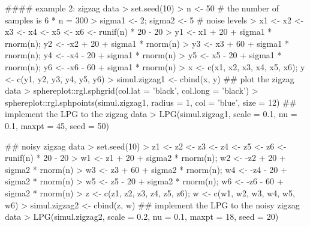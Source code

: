 \begin{example}
   #### example 2: zigzag data
   > set.seed(10)
   > n <- 50                                # the number of samples is 6 * n = 300
   > sigma1 <- 2; sigma2 <- 5               # noise levels                   
   > x1 <- x2 <- x3 <- x4 <- x5 <- x6 <- runif(n) * 20 - 20
   > y1 <- x1 + 20 + sigma1 * rnorm(n); y2 <- -x2 + 20 + sigma1 * rnorm(n)
   > y3 <- x3 + 60 + sigma1 * rnorm(n); y4 <- -x4 - 20 + sigma1 * rnorm(n)
   > y5 <- x5 - 20 + sigma1 * rnorm(n); y6 <- -x6 - 60 + sigma1 * rnorm(n)
   > x <- c(x1, x2, x3, x4, x5, x6); y <- c(y1, y2, y3, y4, y5, y6)
   > simul.zigzag1 <- cbind(x, y)
   ## plot the zigzag data
   > sphereplot::rgl.sphgrid(col.lat = 'black', col.long = 'black')
   > sphereplot::rgl.sphpoints(simul.zigzag1, radius = 1, col = 'blue', size = 12)
   ## implement the LPG to the zigzag data
   > LPG(simul.zigzag1, scale = 0.1, nu = 0.1, maxpt = 45, seed = 50)

   ## noisy zigzag data
   > set.seed(10)
   > z1 <- z2 <- z3 <- z4 <- z5 <- z6 <- runif(n) * 20 - 20
   > w1 <- z1 + 20 + sigma2 * rnorm(n); w2 <- -z2 + 20 + sigma2 * rnorm(n)
   > w3 <- z3 + 60 + sigma2 * rnorm(n); w4 <- -z4 - 20 + sigma2 * rnorm(n)
   > w5 <- z5 - 20 + sigma2 * rnorm(n); w6 <- -z6 - 60 + sigma2 * rnorm(n)
   > z <- c(z1, z2, z3, z4, z5, z6); w <- c(w1, w2, w3, w4, w5, w6)
   > simul.zigzag2 <- cbind(z, w)
   ## implement the LPG to the noisy zigzag data
   > LPG(simul.zigzag2, scale = 0.2, nu = 0.1, maxpt = 18, seed = 20)

\end{example}


